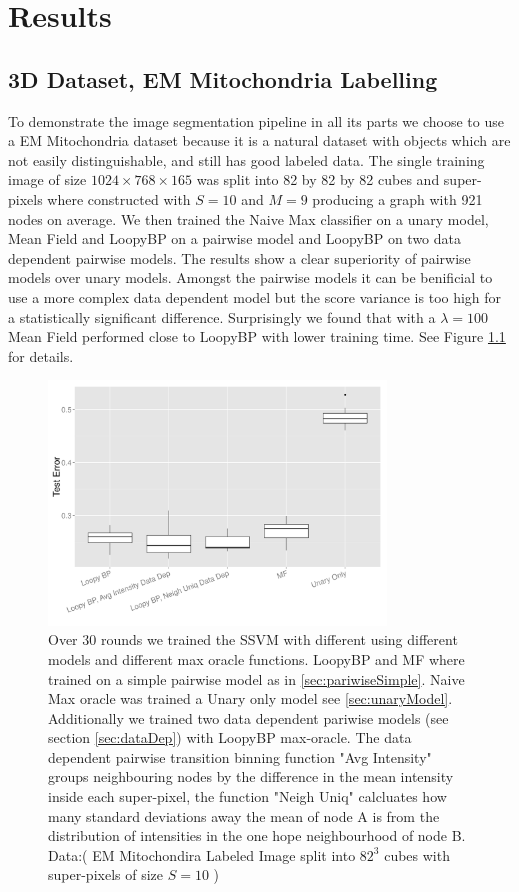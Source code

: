 
%
%
%
%
%

\chapter{Results}
\section{3D Dataset, EM Mitochondria Labelling}
To demonstrate the image segmentation pipeline in all its parts we choose to use a EM Mitochondria dataset because it is a natural dataset with objects which are not easily distinguishable, and still has good labeled data. The single training image of size $1024 \times 768 \times 165$ was split into 82 by 82 by 82 cubes and super-pixels where constructed with $S=10$ and $M=9$ producing a graph with 921 nodes on average. We then trained the Naive Max classifier on a unary model, Mean Field and LoopyBP on a pairwise model and LoopyBP on two data dependent pairwise models. The results show a clear superiority of pairwise models over unary models. Amongst the pairwise models it can be benificial to use a more complex data dependent model but the score variance is too high for a statistically significant difference. Surprisingly we found that with a $\lambda =100$ Mean Field performed close to LoopyBP with lower training time. See Figure \ref{fig:mitochonCmpMethods} for details. 


\begin{figure}[H]
\includegraphics[width=0.8\textwidth]{images/mitochonSplit_testError_end.png}
  \caption {  Over 30 rounds we trained the SSVM with different using different models and different max oracle functions. LoopyBP and MF where trained on a simple pairwise model as in \ref{sec:pariwiseSimple}. Naive Max oracle was trained a Unary only model see \ref{sec:unaryModel}. Additionally we trained two data dependent pariwise models (see section \ref{sec:dataDep}) with LoopyBP max-oracle. The data dependent pairwise transition binning function "Avg Intensity" groups neighbouring nodes by the difference in the mean intensity inside each super-pixel, the function "Neigh Uniq" calcluates how many standard deviations away the mean of node A is from the distribution of intensities in the one hope neighbourhood of node B. Data:( EM Mitochondira Labeled Image split into $82^3$ cubes with super-pixels of size $S=10$ \cite{mitochondriaData} ) } 
  \label{fig:mitochonCmpMethods}
\end{figure}


